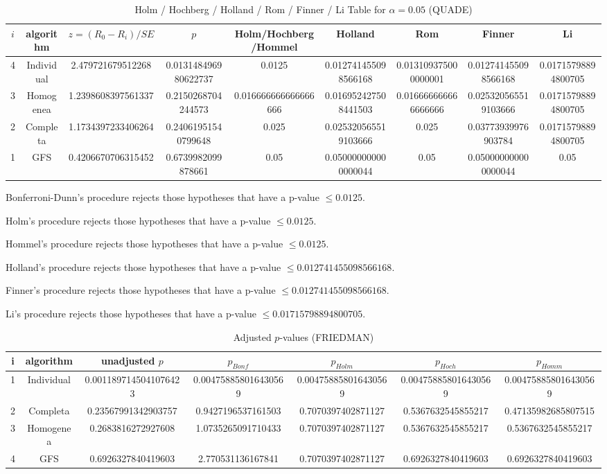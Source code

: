 \documentclass[a4paper,10pt]{article}
\begin{document}
\begin{landscape}
\begin{table}[!htp]
\centering\scriptsize
\caption{Holm / Hochberg / Holland / Rom / Finner / Li Table for $\alpha=0.05$ (QUADE)}
\begin{tabular}{ccccccccc}
$i$&algorithm&$z=(R_0 - R_i)/SE$&$p$&Holm/Hochberg/Hommel&Holland&Rom&Finner&Li\\
\hline
4&Individual&2.479721679512268&0.013148496980622737&0.0125&0.012741455098566168&0.013109375000000001&0.012741455098566168&0.01715798894800705\\
3&Homogenea&1.2398608397561337&0.2150268704244573&0.016666666666666666&0.016952427508441503&0.016666666666666666&0.025320565519103666&0.01715798894800705\\
2&Completa&1.1734397233406264&0.24061951540799648&0.025&0.025320565519103666&0.025&0.03773939976903784&0.01715798894800705\\
1&GFS&0.4206670706315452&0.6739982099878661&0.05&0.050000000000000044&0.05&0.050000000000000044&0.05\\
\hline
\end{tabular}
\end{table}
Bonferroni-Dunn's procedure rejects those hypotheses that have a p-value $\le0.0125$.


Holm's procedure rejects those hypotheses that have a p-value $\le0.0125$.


Hommel's procedure rejects those hypotheses that have a p-value $\le0.0125$.


Holland's procedure rejects those hypotheses that have a p-value $\le0.012741455098566168$.


Finner's procedure rejects those hypotheses that have a p-value $\le0.012741455098566168$.


Li's procedure rejects those hypotheses that have a p-value $\le0.01715798894800705$.



\newpage

\begin{table}[!htp]
\centering\scriptsize
\caption{Adjusted $p$-values (FRIEDMAN)}
\begin{tabular}{ccccccc}
i&algorithm&unadjusted $p$&$p_{Bonf}$&$p_{Holm}$&$p_{Hoch}$&$p_{Homm}$\\
\hline
1&Individual&0.0011897145041076423&0.004758858016430569&0.004758858016430569&0.004758858016430569&0.004758858016430569\\
2&Completa&0.23567991342903757&0.9427196537161503&0.7070397402871127&0.5367632545855217&0.47135982685807515\\
3&Homogenea&0.2683816272927608&1.0735265091710433&0.7070397402871127&0.5367632545855217&0.5367632545855217\\
4&GFS&0.6926327840419603&2.770531136167841&0.7070397402871127&0.6926327840419603&0.6926327840419603\\
\hline
\end{tabular}
\end{table}


\end{landscape}
\end{document}
